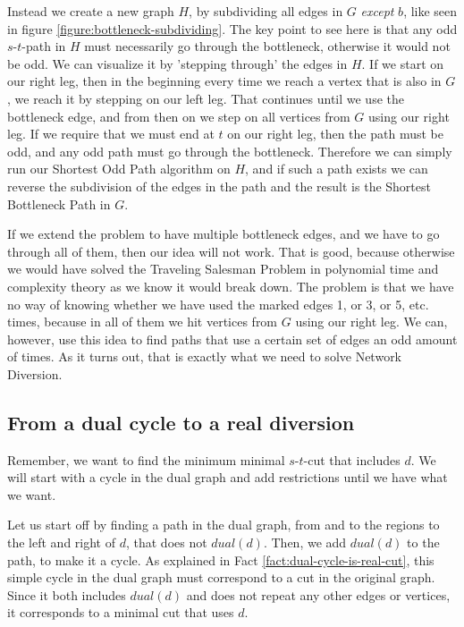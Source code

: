 Instead we create a new graph $H$, by subdividing all edges in $G$ \emph{except} $b$, like seen in figure \ref{figure:bottleneck-subdividing}. The key point to see here is that any odd $s$-$t$-path in $H$ must necessarily go through the bottleneck, otherwise it would not be odd. We can visualize it by 'stepping through' the edges in $H$. If we start on our right leg, then in the beginning every time we reach a vertex that is also in $G$, we reach it by stepping on our left leg. That continues until we use the bottleneck edge, and from then on we step on all vertices from $G$ using our right leg. If we require that we must end at $t$ on our right leg, then the path must be odd, and any odd path must go through the bottleneck. Therefore we can simply run our Shortest Odd Path algorithm on $H$, and if such a path exists we can reverse the subdivision of the edges in the path and the result is the Shortest Bottleneck Path in $G$.

If we extend the problem to have multiple bottleneck edges, and we have to go through all of them, then our idea will not work. That is good, because otherwise we would have solved the Traveling Salesman Problem in polynomial time and complexity theory as we know it would break down.
The problem is that we have no way of knowing whether we have used the marked edges 1, or 3, or 5, etc. times, because in all of them we hit vertices from $G$ using our right leg. We can, however, use this idea to find paths that use a certain set of edges an odd amount of times. As it turns out, that is exactly what we need to solve Network Diversion.


\subsection{From a dual cycle to a real diversion}
Remember, we want to find the minimum minimal $s$-$t$-cut that includes $d$.  We will start with a cycle in the dual graph and add restrictions until we have what we want.

Let us start off by finding a path in the dual graph, from and to the regions to the left and right of $d$, that does not $dual(d)$. Then, we add $dual(d)$ to the path, to make it a cycle. As explained in Fact \ref{fact:dual-cycle-is-real-cut}, this simple cycle in the dual graph must correspond to a cut in the original graph. Since it both includes $dual(d)$ and does not repeat any other edges or vertices, it corresponds to a minimal cut that uses $d$.

